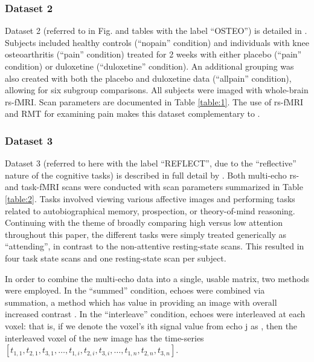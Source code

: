 \documentclass[NETN,manuscript]{stjour-new}
\begin{document}
\subsubsection{Dataset 2}
Dataset 2 (referred to in Fig. and tables with the label ``OSTEO'') is detailed in
\cite{tetreaultBrainConnectivityPredicts2016}. Subjects included healthy controls (``nopain''
condition) and individuals with knee osteoarthritis (``pain'' condition) treated for 2 weeks with
either placebo (``pain'' condition) or duloxetine (``duloxetine'' condition). An additional grouping was
also created with both the placebo and duloxetine data (``allpain'' condition), allowing for six
subgroup comparisons. All subjects were imaged with whole-brain rs-fMRI. Scan parameters are
documented in Table \ref{table:1}. The use of rs-fMRI and RMT for examining pain makes this dataset
complementary to \cite{matharooSpontaneousBackpainAlters2020}.

\subsubsection{Dataset 3}
Dataset 3  (referred to here with the label ``REFLECT'', due to the ``reflective” nature of the
cognitive tasks) is described in full detail by \cite{dupreMultiechoFMRIReplication2016}. Both
multi-echo rs- and task-fMRI scans were conducted with scan parameters summarized in Table \ref{table:2}. Tasks
involved viewing various affective images \citep[see][for details]{sprengPatternsBrainActivity2010}
and performing tasks related to autobiographical memory, prospection, or theory-of-mind reasoning.
Continuing with the theme of broadly comparing high versus low attention throughout this paper, the
different tasks were simply treated generically as ``attending'', in contrast to the non-attentive
resting-state scans. This resulted in four task state scans and one resting-state scan per subject.

In order to combine the multi-echo data into a single, usable matrix, two methods were employed. In
the ``summed'' condition, echoes were combined via summation, a method which has value in providing an
image with overall increased contrast \citep{kunduMultiechoFMRIReview2017}. In the ``interleave''
condition, echoes were interleaved at each voxel: that is, if we denote the voxel's ith signal value
from echo j as , then the interleaved voxel of the new image has the time-series \([t_{1,1},
t_{2,1}, t_{3,1}, \dots, t_{1,i}, t_{2,i}, t_{3,i}, \dots, t_{1,n}, t_{2,n}, t_{3,n}]\).
\end{document}

